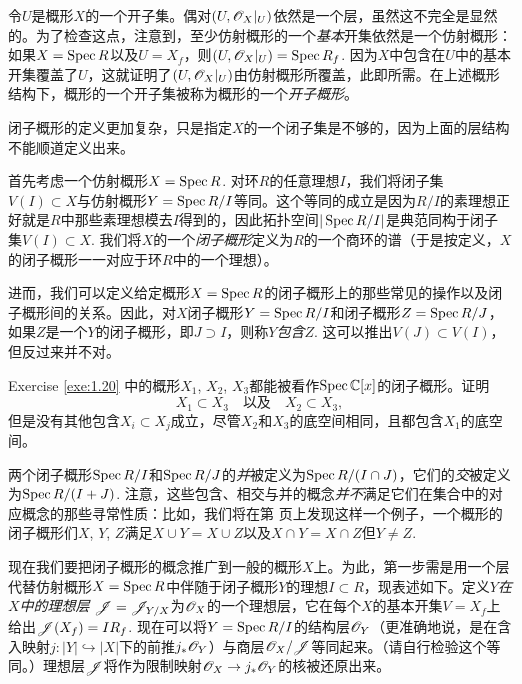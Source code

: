令$U$是概形$X$的一个开子集。偶对$(U,\mathscr{O}_X|_U)$依然是一个层，虽然这不完全是显然的。为了检查这点，注意到，至少仿射概形的一个\textit{基本}开集依然是一个仿射概形：如果$X=\operatorname{Spec} R$以及$U=X_f$，则$(U,\mathscr{O}_X|_U)=\operatorname{Spec} R_f$. 因为$X$中包含在$U$中的基本开集覆盖了$U$，这就证明了$(U,\mathscr{O}_X|_U)$由仿射概形所覆盖，此即所需。在上述概形结构下，概形的一个开子集被称为概形的一个\textit{开子概形}。

闭子概形的定义更加复杂，只是指定$X$的一个闭子集是不够的，因为上面的层结构不能顺道定义出来。

首先考虑一个仿射概形$X=\operatorname{Spec} R$. 对环$R$的任意理想$I$，我们将闭子集$V(I)\subset X$与仿射概形$Y=\operatorname{Spec} R/I$等同。这个等同的成立是因为$R/I$的素理想正好就是$R$中那些素理想模去$I$得到的，因此拓扑空间$|\operatorname{Spec} R/I|$是典范同构于闭子集$V(I)\subset X$. 我们将$X$的一个\textit{闭子概形}定义为$R$的一个商环的谱（于是按定义，$X$的闭子概形一一对应于环$R$中的一个理想）。

进而，我们可以定义给定概形$X=\operatorname{Spec} R$的闭子概形上的那些常见的操作以及闭子概形间的关系。因此，对$X$闭子概形$Y=\operatorname{Spec} R/I$和闭子概形$Z=\operatorname{Spec} R/J$，如果$Z$是一个$Y$的闭子概形，即$J\supset I$，则称$Y$\textit{包含}$Z$. 这可以推出$V(J)\subset V(I)$，但反过来并不对。

\begin{exe}\label{exe:1.26}
	Exercise \ref{exe:1.20} 中的概形$X_1$, $X_2$, $X_3$都能被看作$\operatorname{Spec} \mathbb{C}[x]$的闭子概形。证明
	\[
	X_1\subset X_3\quad \text{以及}\quad X_2\subset X_3,
	\]
	但是没有其他包含$X_i\subset X_j$成立，尽管$X_2$和$X_3$的底空间相同，且都包含$X_1$的底空间。
\end{exe}

两个闭子概形$\operatorname{Spec} R/I$和$\operatorname{Spec} R/J$的\textit{并}被定义为$\operatorname{Spec} R/(I\cap J)$，它们的\textit{交}被定义为$\operatorname{Spec} R/(I+J)$. 注意，这些包含、相交与并的概念\textit{并不}满足它们在集合中的对应概念的那些寻常性质：比如，我们将在第 \pageref{p:69} 页上发现这样一个例子，一个概形的闭子概形们$X$, $Y$, $Z$满足$X\cup Y=X\cup Z$以及$X\cap Y=X\cap Z$但$Y\neq Z$.

现在我们要把闭子概形的概念推广到一般的概形$X$上。为此，第一步需是用一个层代替仿射概形$X=\operatorname{Spec} R$中伴随于闭子概形$Y$的理想$I\subset R$，现表述如下。定义$Y$\textit{在}$X$\textit{中的理想层} $\mathscr{J}=\mathscr{J}_{Y/X}$为$\mathscr{O}_X$的一个理想层，它在每个$X$的基本开集$V=X_f$上给出$\mathscr{J}(X_f)=I R_f$. 现在可以将$Y=\operatorname{Spec} R/I$的结构层$\mathscr{O}_Y$（更准确地说，是在含入映射$j:|Y|\hookrightarrow |X|$下的前推$j_{*}\mathscr{O}_Y$）与商层$\mathscr{O}_X/\mathscr{J}$等同起来。（请自行检验这个等同。）理想层$\mathscr{J}$将作为限制映射$\mathscr{O}_X\to j_*\mathscr{O}_Y$的核被还原出来。

